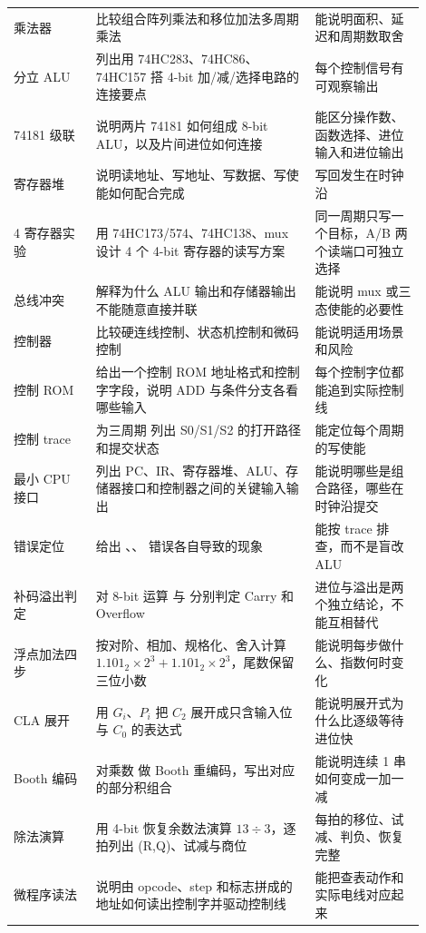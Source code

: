 \begin{longtable}{L{0.18\linewidth}L{0.48\linewidth}L{0.24\linewidth}}
乘法器 & 比较组合阵列乘法和移位加法多周期乘法 & 能说明面积、延迟和周期数取舍 \\
分立 ALU & 列出用 74HC283、74HC86、74HC157 搭 4-bit 加/减/选择电路的连接要点 & 每个控制信号有可观察输出 \\
74181 级联 & 说明两片 74181 如何组成 8-bit ALU，以及片间进位如何连接 & 能区分操作数、函数选择、进位输入和进位输出 \\
寄存器堆 & 说明读地址、写地址、写数据、写使能如何配合完成  & 写回发生在时钟沿 \\
4 寄存器实验 & 用 74HC173/574、74HC138、mux 设计 4 个 4-bit 寄存器的读写方案 & 同一周期只写一个目标，A/B 两个读端口可独立选择 \\
总线冲突 & 解释为什么 ALU 输出和存储器输出不能随意直接并联 & 能说明 mux 或三态使能的必要性 \\
控制器 & 比较硬连线控制、状态机控制和微码控制 & 能说明适用场景和风险 \\
控制 ROM & 给出一个控制 ROM 地址格式和控制字字段，说明 ADD 与条件分支各看哪些输入 & 每个控制字位都能追到实际控制线 \\
控制 trace & 为三周期  列出 S0/S1/S2 的打开路径和提交状态 & 能定位每个周期的写使能 \\
最小 CPU 接口 & 列出 PC、IR、寄存器堆、ALU、存储器接口和控制器之间的关键输入输出 & 能说明哪些是组合路径，哪些在时钟沿提交 \\
错误定位 & 给出 、、 错误各自导致的现象 & 能按 trace 排查，而不是盲改 ALU \\
补码溢出判定 & 对 8-bit 运算  与  分别判定 Carry 和 Overflow & 进位与溢出是两个独立结论，不能互相替代 \\
浮点加法四步 & 按对阶、相加、规格化、舍入计算 $1.101_2\times2^3+1.101_2\times2^3$，尾数保留三位小数 & 能说明每步做什么、指数何时变化 \\
CLA 展开 & 用 $G_i$、$P_i$ 把 $C_2$ 展开成只含输入位与 $C_0$ 的表达式 & 能说明展开式为什么比逐级等待进位快 \\
Booth 编码 & 对乘数  做 Booth 重编码，写出对应的部分积组合 & 能说明连续 1 串如何变成一加一减 \\
除法演算 & 用 4-bit 恢复余数法演算 $13\div3$，逐拍列出 (R,Q)、试减与商位 & 每拍的移位、试减、判负、恢复完整 \\
微程序读法 & 说明由 opcode、step 和标志拼成的地址如何读出控制字并驱动控制线 & 能把查表动作和实际电线对应起来 \\
\bottomrule
\end{longtable}

